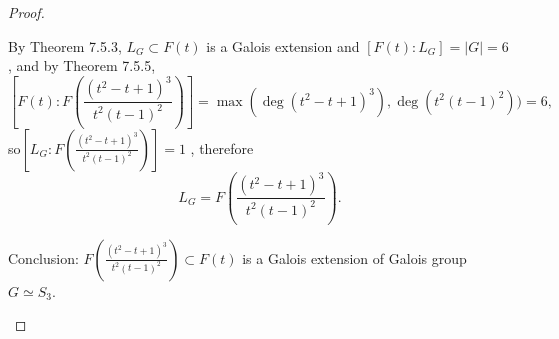 \documentclass[11pt,a4paper]{article}
\begin{document}
\begin{proof}
\begin{enumerate}
By Theorem 7.5.3, $L_G \subset F(t)$ is a Galois extension and $[F(t):L_G] = \vert G \vert = 6$, and by Theorem 7.5.5, $$\left[F(t) : F\left(\frac{(t^2-t+1)^3}{t^2(t-1)^2} \right) \right] = \max(\deg(t^2-t+1)^3), \deg(t^2(t-1)^2)) = 6,$$ so{$\left[L_G :  F\left(\frac{(t^2-t+1)^3}{t^2(t-1)^2} \right)\right] = 1$ }, therefore
$$L_G = F\left(\frac{(t^2-t+1)^3}{t^2(t-1)^2} \right).$$

Conclusion:  $F\left(\frac{(t^2-t+1)^3}{t^2(t-1)^2} \right) \subset F(t)$ is a Galois extension of Galois group $G \simeq S_3$.

\end{enumerate}
\end{proof}
\end{document}
